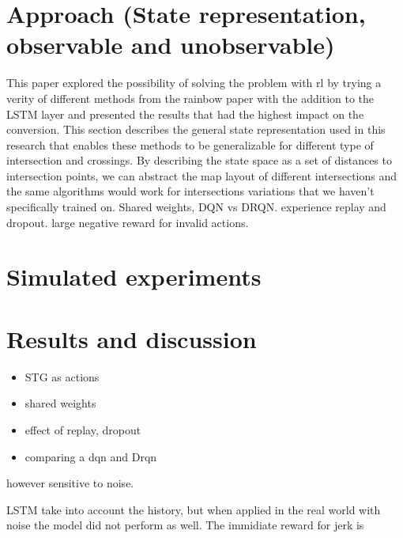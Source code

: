\section{Approach (State representation, observable and unobservable)}
This paper explored the possibility of solving the problem with \gls{rl} by trying a verity of different methods from the rainbow paper with the addition to the LSTM layer and presented the results that had the highest impact on the conversion. 
This section describes the general state representation used in this research that enables these methods to be generalizable for different type of intersection and crossings. 
By describing the state space as a set of distances to intersection points, we can abstract the map layout of different intersections and the same algorithms would work for intersections variations that we haven't specifically trained on. 
Shared weights, DQN vs DRQN. 
experience replay and dropout. 
large negative reward for invalid actions.
\section{Simulated experiments}
\section{Results and discussion}
\begin{itemize}
  \item STG as actions
  \item shared weights
  \item effect of replay, dropout 
  \item comparing a dqn and Drqn 
\end{itemize}
however sensitive to noise. 

LSTM take into account the history, but when applied in the real world with noise the model did not perform as well. 
The immidiate reward for jerk is 


